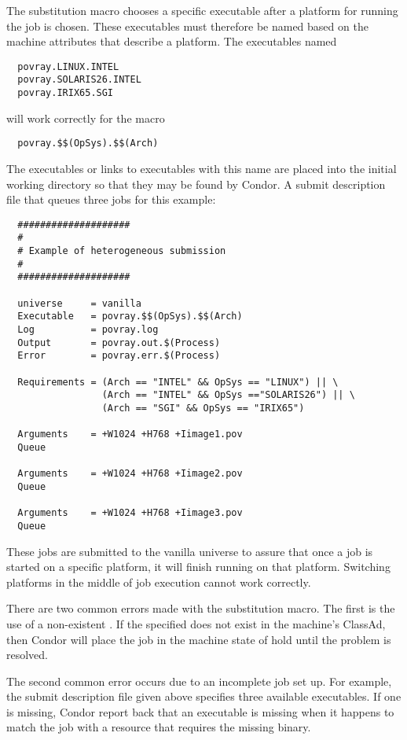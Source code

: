 The substitution macro chooses a specific executable after
a platform for running the job is chosen.
These executables must therefore be named based on the
machine attributes that describe a platform.
The executables named \begin{verbatim}
  povray.LINUX.INTEL
  povray.SOLARIS26.INTEL
  povray.IRIX65.SGI
\end{verbatim}
will work correctly for the macro
\begin{verbatim}
  povray.$$(OpSys).$$(Arch)
\end{verbatim}

The executables or links to executables with this name
are placed into the initial working directory so that they may be
found by Condor. 
A submit description file that queues three jobs for this example:

\begin{verbatim}
  ####################
  #
  # Example of heterogeneous submission
  #
  ####################

  universe     = vanilla
  Executable   = povray.$$(OpSys).$$(Arch)
  Log          = povray.log
  Output       = povray.out.$(Process)
  Error        = povray.err.$(Process)

  Requirements = (Arch == "INTEL" && OpSys == "LINUX") || \
                 (Arch == "INTEL" && OpSys =="SOLARIS26") || \
                 (Arch == "SGI" && OpSys == "IRIX65")

  Arguments    = +W1024 +H768 +Iimage1.pov
  Queue 

  Arguments    = +W1024 +H768 +Iimage2.pov
  Queue 

  Arguments    = +W1024 +H768 +Iimage3.pov
  Queue 
\end{verbatim}

These jobs are submitted to the vanilla universe
to assure that once a job is started on a specific platform,
it will finish running on that platform.
Switching platforms in the middle of job execution cannot
work correctly.

There are two common errors made with the substitution macro.
The first is the use of a non-existent .
If the specified \AdAttr{MachineAdAttribute} does not
exist in the machine's ClassAd, then Condor will place
the job in the machine state of hold until the problem is resolved.

The second common error occurs due to an incomplete job set up.
For example, the submit description file given above specifies
three available executables.
If one is missing, Condor report back that an
executable is missing when it happens to match the
job with a resource that requires the missing binary.

